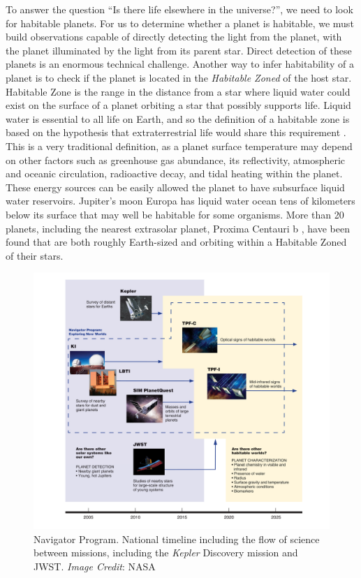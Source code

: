 To answer the question ``Is there life elsewhere in the universe?'', we need to look for habitable planets. For us to determine whether a planet is habitable, we must build observations capable of directly detecting the light from the planet, with the planet illuminated by the light from its parent star. Direct detection of these planets is an enormous technical challenge. Another way to infer habitability of a planet is to check if the planet is located in the \emph{Habitable Zoned} of the host star. Habitable Zone is the range in the distance from a star where liquid water could exist on the surface of a planet orbiting a star that possibly supports life. Liquid water is essential to all life on Earth, and so the definition of a habitable zone is based on the hypothesis that extraterrestrial life would share this requirement \cite{2014ApJ...787L..29K}. This is a very traditional definition, as a planet surface temperature may depend on other factors such as greenhouse gas abundance, its reflectivity, atmospheric and oceanic circulation, radioactive decay, and tidal heating within the planet. These energy sources can be easily allowed the planet to have subsurface liquid water reservoirs.  Jupiter's moon Europa has liquid water ocean tens of kilometers below its surface that may well be habitable for some organisms. More than 20 planets, including the nearest extrasolar planet, Proxima Centauri b \cite{2016Natur.536..437A}, have been found that are both roughly Earth-sized and orbiting within a Habitable Zoned of their stars. 


\begin{figure}[!h]
\begin{center}
        \includegraphics[width=0.8\textheight]{img/navigatorprogram.png}
        \caption{Navigator Program. National timeline including the flow of science between missions, including the \emph{Kepler} Discovery mission and JWST.
\emph{Image Credit}: NASA}  \label{fig:np}
\end{center}
\end{figure}

